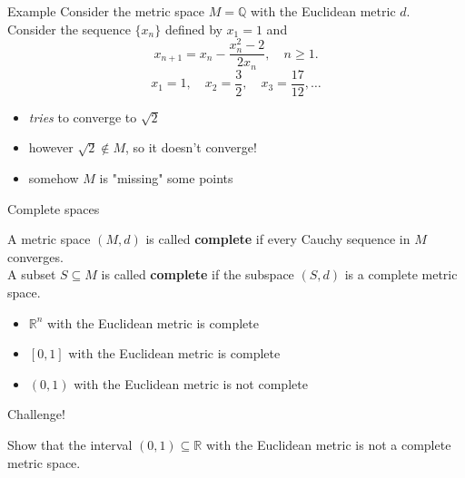 \documentclass{beamer}
\begin{document}
\begin{frame}{Example}
Consider the metric space $M=\mathbb{Q}$ with the Euclidean metric $d$.\\
\pause
Consider the sequence $\{x_n\}$ defined by $x_1 = 1$ and
$$x_{n+1} = x_n - \frac{x_n^2-2}{2x_n},\quad n\geq 1.$$
\pause
$$x_1 = 1,\quad x_2 = \frac{3}{2},\quad x_3 = \frac{17}{12},\dots$$
\begin{itemize}
\pause
\item \emph{tries} to converge to $\sqrt{2}$
\pause
\item however $\sqrt{2}\notin M$, so it doesn't converge!
\pause
\item somehow $M$ is "missing" some points
\end{itemize}
\end{frame}

\begin{frame}{Complete spaces}
\begin{defn}
A metric space $(M,d)$ is called \textbf{complete} if every Cauchy sequence in $M$ converges.\\
\pause
A subset $S\subseteq M$ is called \textbf{complete} if the subspace $(S,d)$ is a complete metric space.
\end{defn}
\begin{itemize}
\pause
\item $\mathbb R^n$ with the Euclidean metric is complete
\pause
\item $[0,1]$ with the Euclidean metric is complete
\pause
\item $(0,1)$ with the Euclidean metric is not complete
\end{itemize}
\end{frame}

\begin{frame}{Challenge!}
\begin{prob}
Show that the interval $(0,1)\subseteq\mathbb{R}$ with the Euclidean metric is not a complete metric space.
\end{prob}
\end{frame}
\end{document}
